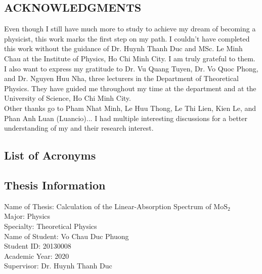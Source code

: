 \documentclass[12pt,english,a4paper]{article}
\begin{document}
	\newpage
	\begin{center}
		\section*{ACKNOWLEDGMENTS}
	\end{center}
	\quad Even though I still have much more to study to achieve my dream of becoming a physicist, this work marks the first step on my path. I couldn't have completed this work without the guidance of Dr. Huynh Thanh Duc and MSc. Le Minh Chau at the Institute of Physics, Ho Chi Minh City. I am truly grateful to them.\\\null
	\quad I also want to express my gratitude to Dr. Vu Quang Tuyen, Dr. Vo Quoc Phong, and Dr. Nguyen Huu Nha, three lecturers in the Department of Theoretical Physics. They have guided me throughout my time at the department and at the University of Science, Ho Chi Minh City.\\\null
	\quad Other thanks go to Pham Nhat Minh, Le Huu Thong, Le Thi Lien, Kien Le, and Phan Anh Luan (Luancio)... I had multiple interesting discussions for a better understanding of my and their research interest.
	\newpage
	\pagestyle{plain}
	\tableofcontents
	\newpage
	\begin{center}
	\section*{List of Acronyms}
	\end{center}
	\begin{acronym} %
	\end{acronym}
	\newpage
	\begin{center}
		\listoffigures
		\listoftables
	\end{center}
	\newpage
	\begin{center}
		\section*{Thesis Information}
	\end{center}
\quad Name of Thesis: Calculation of the Linear-Absorption Spectrum of $\mathrm{MoS}_2$\\\null
\quad Major: Physics\\\null
\quad Specialty: Theoretical Physics\\\null
\quad Name of Student: Vo Chau Duc Phuong\\\null
\quad Student ID: 20130008\\\null
\quad Academic Year: 2020\\\null
\quad Supervisor: Dr. Huynh Thanh Duc \\\null
\end{document}
